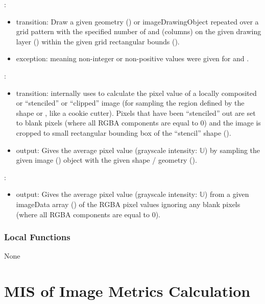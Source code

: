 \documentclass[12pt, titlepage]{article}
\begin{document}
\noindent {}:
\begin{itemize}
\item transition: Draw a given geometry () or imageDrawingObject repeated over a grid pattern
  with the specified number of  and  (columns) on the given drawing
  layer () within the given grid rectangular bounds ().
\item exception:  meaning non-integer or non-positive values were given for
   and .
\end{itemize}

\noindent {}:
\begin{itemize}
\item transition: internally uses  to calculate the pixel value
  of a locally composited or ``stenciled'' or ``clipped'' image (for sampling the region
  defined by the shape or , like a cookie cutter).
  Pixels that have been ``stenciled'' out are set to blank pixels (where all RGBA components are equal to 0)
  and the image is cropped to small rectangular bounding box of the ``stencil'' shape ().
\item output: Gives the average pixel value (grayscale intensity: $\mathbb{U}$) by sampling the given image
  () object with the given shape / geometry ().
\end{itemize}

\noindent {}:
\begin{itemize}
  \item output: Gives the average pixel value (grayscale intensity: $\mathbb{U}$) from a given imageData
  array () of the RGBA pixel values ignoring
  any blank pixels (where all RGBA components are equal to 0).
\end{itemize}

\subsubsection{Local Functions}
None

\newpage



\section{MIS of Image Metrics Calculation} \label{MS_metrics}
\end{document}
